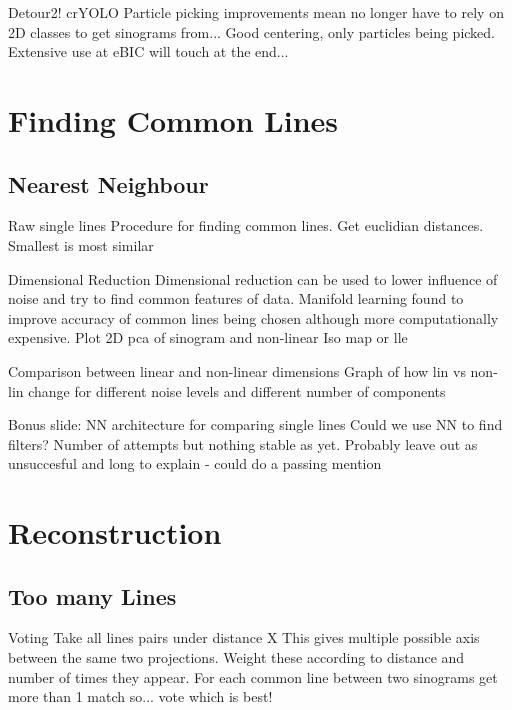 \documentclass[t, 11pt]{beamer}
\begin{document}
\begin{frame}[fragile]{Detour2! crYOLO}
  Particle picking improvements mean no longer have to rely on 2D classes to get sinograms from...
  Good centering, only particles being picked.
  Extensive use at eBIC will touch at the end...
\end{frame}


\section{Finding Common Lines}
\subsection*{Nearest Neighbour}

\begin{frame}[fragile]{Raw single lines}
  Procedure for finding common lines. Get euclidian distances. Smallest is most similar
\end{frame}

\begin{frame}[fragile]{Dimensional Reduction}
  Dimensional reduction can be used to lower influence of noise and try to find common features of data.
  Manifold learning found to improve accuracy of common lines being chosen although more computationally expensive.
  Plot 2D pca of sinogram
  and non-linear Iso map or lle
\end{frame}

\begin{frame}[fragile]{Comparison between linear and non-linear dimensions}
  Graph of how lin vs non-lin change for different noise levels and different number of components
\end{frame}

\begin{frame}[fragile]{Bonus slide: NN architecture for comparing single lines}
  Could we use NN to find filters? Number of attempts but nothing stable as yet.
  Probably leave out as unsuccesful and long to explain - could do a passing mention
\end{frame}

\section{Reconstruction}
\subsection*{Too many Lines}
\begin{frame}[fragile]{Voting}
  Take all lines pairs under distance X
  This gives multiple possible axis between the same two projections. Weight these according to distance and number of times they appear.
  For each common line between two sinograms get more than 1 match so... vote which is best!
\end{frame}
\end{document}
